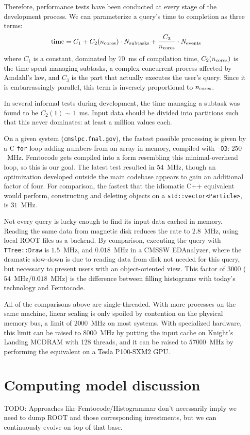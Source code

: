 \documentclass{article}
\begin{document}
Therefore, performance tests have been conducted at every stage of the development process. We can parameterize a query's time to completion as three terms:
\begin{equation}
\mbox{time} = C_1 + C_2(n_{\mbox{\scriptsize cores}}) \cdot N_{\mbox{\scriptsize subtasks}} + \frac{C_3}{n_{\mbox{\scriptsize cores}}} \cdot N_{\mbox{\scriptsize events}}
\end{equation}
where $C_1$ is a constant, dominated by $70$~ms of compilation time, $C_2(n_{\mbox{\scriptsize cores}})$ is the time spent managing subtasks, a complex concurrent process affected by Amdahl's law, and $C_3$ is the part that actually executes the user's query. Since it is embarrassingly parallel, this term is inversely proportional to $n_{\mbox{\scriptsize cores}}$.

In several informal tests during development, the time managing a subtask was found to be $C_2(1) \sim 1$~ms. Input data should be divided into partitions such that this never dominates: at least a million values each.

On a given system ({\tt cmslpc.fnal.gov}), the fastest possible processing is given by a C {\tt for} loop adding numbers from an array in memory, compiled with {\tt -O3}: $250$~MHz. Femtocode gets compiled into a form resembling this minimal-overhead loop, so this is our goal. The latest test resulted in $54$~MHz, though an optimization developed outside the main codebase appears to gain an additional factor of four. For comparison, the fastest that the idiomatic C++ equivalent would perform, constructing and deleting objects on a {\tt std::vector<Particle>}, is $31$~MHz.

Not every query is lucky enough to find its input data cached in memory. Reading the same data from magnetic disk reduces the rate to $2.8$~MHz, using local ROOT files as a backend. By comparison, executing the query with {\tt TTree::Draw} is $1.5$~MHz, and $0.018$~MHz in a CMSSW EDAnalyzer, where the dramatic slow-down is due to reading data from disk not needed for this query, but necessary to present users with an object-oriented view. This factor of 3000 ($54$~MHz/$0.018$~MHz) is the difference between filling histograms with today's technology and Femtocode.

All of the comparisons above are single-threaded. With more processes on the same machine, linear scaling is only spoiled by contention on the physical memory bus, a limit of $2000$~MHz on most systems. With specialized hardware\footnotemark, this limit can be raised to $8000$~MHz by putting the input cache on Knight's Landing MCDRAM with 128 threads, and it can be raised to $57000$~MHz by performing the equivalent on a Tesla P100-SXM2 GPU.


\section{Computing model discussion}

TODO: Approaches like Femtocode/Histogrammar don't necessarily imply we need to dump ROOT and those corresponding investments, but we can continuously evolve on top of that base.
\end{document}
